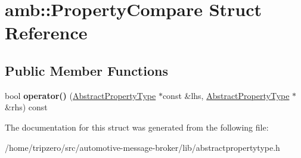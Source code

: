 \hypertarget{structamb_1_1PropertyCompare}{\section{amb\-:\-:Property\-Compare Struct Reference}
\label{structamb_1_1PropertyCompare}
}
\subsection*{Public Member Functions}
\begin{DoxyCompactItemize}
\item 
\hypertarget{structamb_1_1PropertyCompare_a35a52d2d6771dc476570a47947ed2631}{bool {\bfseries operator()} (\hyperlink{classAbstractPropertyType}{Abstract\-Property\-Type} $\ast$const \&lhs, \hyperlink{classAbstractPropertyType}{Abstract\-Property\-Type} $\ast$\&rhs) const }\label{structamb_1_1PropertyCompare_a35a52d2d6771dc476570a47947ed2631}

\end{DoxyCompactItemize}


The documentation for this struct was generated from the following file\-:\begin{DoxyCompactItemize}
\item 
/home/tripzero/src/automotive-\/message-\/broker/lib/abstractpropertytype.\-h\end{DoxyCompactItemize}
